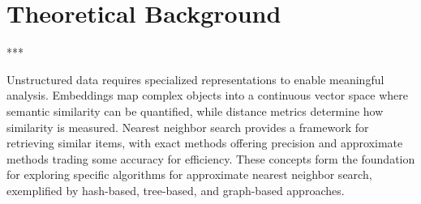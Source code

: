 \chapter{Theoretical Background}




\begin{center}
    \vspace{0.5cm}
    *\hspace{2cm}*\hspace{2cm}*
    \vspace{0.3cm}
\end{center}

Unstructured data requires specialized representations to enable meaningful analysis. Embeddings map complex objects into a continuous vector space where semantic similarity can be quantified, while distance metrics determine how similarity is measured. Nearest neighbor search provides a framework for retrieving similar items, with exact methods offering precision and approximate methods trading some accuracy for efficiency. These concepts form the foundation for exploring specific algorithms for approximate nearest neighbor search, exemplified by hash-based, tree-based, and graph-based approaches.